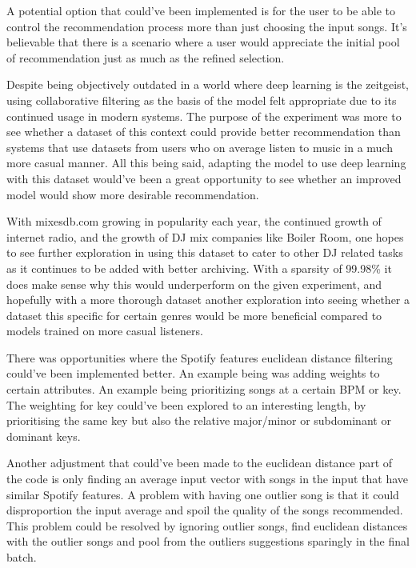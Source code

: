 A potential option that could've been implemented is for the user to be able to control the recommendation process more than just choosing the input songs. It's believable that there is a scenario where a user would appreciate the initial pool of recommendation just as much as the refined selection.

Despite being objectively outdated in a world where deep learning is the zeitgeist, using collaborative filtering as the basis of the model felt appropriate due to its continued usage in modern systems. The purpose of the experiment was more to see whether a dataset of this context could provide better recommendation than systems that use datasets from users who on average listen to music in a much  more casual manner. All this being said, adapting the model to use deep learning with this dataset would've been a great opportunity to see whether an improved model would show more desirable recommendation.

With mixesdb.com growing in popularity each year, the continued growth of internet radio, and the growth of DJ mix companies like Boiler Room, one hopes to see further exploration in using this dataset to cater to other DJ related tasks as it continues to be added with better archiving. With a sparsity of 99.98\% it does make sense why this would underperform on the given experiment, and hopefully with a more thorough dataset another exploration into seeing whether a dataset this specific for certain genres would be more beneficial compared to models trained on more casual listeners. 

There was opportunities where the Spotify features euclidean distance filtering could've been implemented better. An example being was adding weights to certain attributes. An example being prioritizing songs at a certain BPM or key. The weighting for key could've been explored to an interesting length, by prioritising the same key but also the relative major/minor or subdominant or dominant keys.

Another adjustment that could've been made to the euclidean distance part of the code is only finding an average input vector with songs  in the input that have similar Spotify features. A problem with having one outlier song is that it could disproportion the input average and spoil the quality of the songs recommended. This problem could be resolved by ignoring outlier songs, find euclidean distances with the outlier songs and pool from the outliers suggestions sparingly in the final batch.

